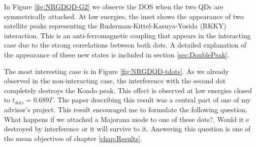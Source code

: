 In Figure \ref{fig:NRGDQD-G2} we observe the DOS when the two QDs are symmetrically attached.  At low energies, the inset shows the appearance of two satellite peaks representing the Ruderman-Kittel-Kasuya-Yosida (RKKY) interaction. This is an anti-ferromagnetic coupling that appears in the interacting case due to the strong correlations between both dots. A detailed explanation of the appearance of these new states is included in section \ref{sec:DoublePeak}.  

The most interesting case is in Figure \ref{fig:NRGDQD-tdots}. As we already observed in the non-interacting case, the interference with the second dot completely destroys the Kondo peak. This effect is observed at low energies closed to $t_{dots}=0.689\Gamma$. The paper describing this result was a central part of one of my advisor's project. This result encouraged me to formulate the following question. What happens if we attached a Majorana mode to one of these dots?. Would it e destroyed by interference or it will survive to it. Answering this question is one of the mean objectives of chapter \ref{chap:Results}. 



